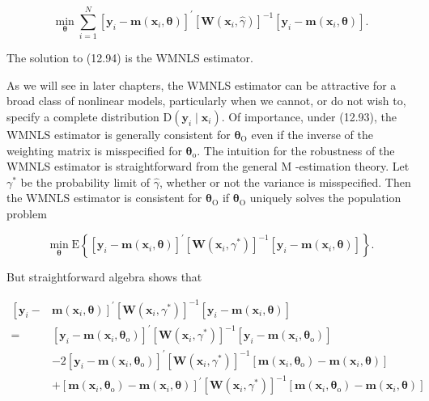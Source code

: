 \documentclass[10pt]{article}
\begin{document}
\begin{equation*}
\min _{\boldsymbol{\theta}} \sum_{i=1}^{N}\left[\mathbf{y}_{i}-\mathbf{m}\left(\mathbf{x}_{i}, \boldsymbol{\theta}\right)\right]^{\prime}\left[\mathbf{W}\left(\mathbf{x}_{i}, \hat{\gamma}\right)\right]^{-1}\left[\mathbf{y}_{i}-\mathbf{m}\left(\mathbf{x}_{i}, \boldsymbol{\theta}\right)\right] . \tag{12.94}
\end{equation*}


The solution to (12.94) is the WMNLS estimator.

As we will see in later chapters, the WMNLS estimator can be attractive for a broad class of nonlinear models, particularly when we cannot, or do not wish to, specify a complete distribution $\mathrm{D}\left(\mathbf{y}_{i} \mid \mathbf{x}_{i}\right)$. Of importance, under (12.93), the WMNLS estimator is generally consistent for $\boldsymbol{\theta}_{\mathrm{O}}$ even if the inverse of the weighting matrix is misspecified for $\boldsymbol{\theta}_{\mathrm{o}}$. The intuition for the robustness of the WMNLS estimator is straightforward from the general M -estimation theory. Let $\gamma^{*}$ be the probability limit of $\hat{\gamma}$, whether or not the variance is misspecified. Then the WMNLS estimator is consistent for $\boldsymbol{\theta}_{\mathrm{O}}$ if $\boldsymbol{\theta}_{\mathrm{O}}$ uniquely solves the population problem

$$
\min _{\boldsymbol{\theta}} \mathrm{E}\left\{\left[\mathbf{y}_{i}-\mathbf{m}\left(\mathbf{x}_{i}, \boldsymbol{\theta}\right)\right]^{\prime}\left[\mathbf{W}\left(\mathbf{x}_{i}, \gamma^{*}\right)\right]^{-1}\left[\mathbf{y}_{i}-\mathbf{m}\left(\mathbf{x}_{i}, \boldsymbol{\theta}\right)\right]\right\} .
$$

But straightforward algebra shows that

$$
\begin{aligned}
{\left[\mathbf{y}_{i}-\right.} & \left.\mathbf{m}\left(\mathbf{x}_{i}, \boldsymbol{\theta}\right)\right]^{\prime}\left[\mathbf{W}\left(\mathbf{x}_{i}, \gamma^{*}\right)\right]^{-1}\left[\mathbf{y}_{i}-\mathbf{m}\left(\mathbf{x}_{i}, \boldsymbol{\theta}\right)\right] \\
= & {\left[\mathbf{y}_{i}-\mathbf{m}\left(\mathbf{x}_{i}, \boldsymbol{\theta}_{\mathrm{o}}\right)\right]^{\prime}\left[\mathbf{W}\left(\mathbf{x}_{i}, \gamma^{*}\right)\right]^{-1}\left[\mathbf{y}_{i}-\mathbf{m}\left(\mathbf{x}_{i}, \boldsymbol{\theta}_{\mathrm{o}}\right)\right] } \\
& -2\left[\mathbf{y}_{i}-\mathbf{m}\left(\mathbf{x}_{i}, \boldsymbol{\theta}_{\mathrm{o}}\right)\right]^{\prime}\left[\mathbf{W}\left(\mathbf{x}_{i}, \gamma^{*}\right)\right]^{-1}\left[\mathbf{m}\left(\mathbf{x}_{i}, \boldsymbol{\theta}_{\mathrm{o}}\right)-\mathbf{m}\left(\mathbf{x}_{i}, \boldsymbol{\theta}\right)\right] \\
& +\left[\mathbf{m}\left(\mathbf{x}_{i}, \boldsymbol{\theta}_{\mathrm{o}}\right)-\mathbf{m}\left(\mathbf{x}_{i}, \boldsymbol{\theta}\right)\right]^{\prime}\left[\mathbf{W}\left(\mathbf{x}_{i}, \gamma^{*}\right)\right]^{-1}\left[\mathbf{m}\left(\mathbf{x}_{i}, \boldsymbol{\theta}_{\mathrm{o}}\right)-\mathbf{m}\left(\mathbf{x}_{i}, \boldsymbol{\theta}\right)\right]
\end{aligned}
$$
\end{document}
